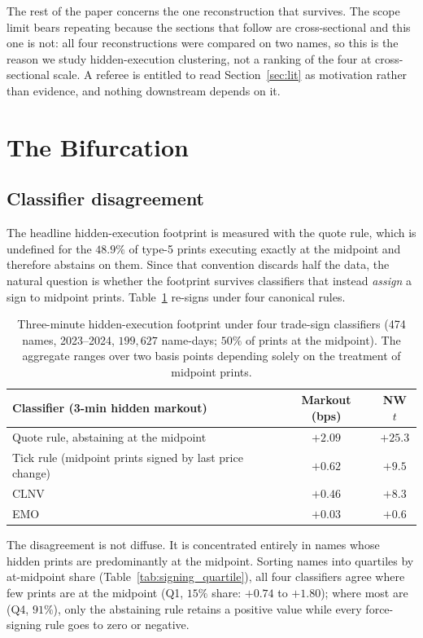 \documentclass[11pt]{article}
\begin{document}
The rest of the paper concerns the one reconstruction that survives. The scope limit bears
repeating because the sections that follow are cross-sectional and this one is not: all four
reconstructions were compared on two names, so this is the reason we study hidden-execution
clustering, not a ranking of the four at cross-sectional scale. A referee is entitled to
read Section~\ref{sec:lit} as motivation rather than evidence, and nothing downstream
depends on it.

\section{The Bifurcation}
\label{sec:bifurcation}

\subsection{Classifier disagreement}

The headline hidden-execution footprint is measured with the quote rule, which is undefined
for the $48.9\%$ of type-5 prints executing exactly at the midpoint and therefore abstains
on them. Since that convention discards half the data, the natural question is whether the
footprint survives classifiers that instead \emph{assign} a sign to midpoint prints.
Table~\ref{tab:signing} re-signs under four canonical rules.

\begin{table}[htbp]
\centering
\begin{tabular}{lcc}
\toprule
\textbf{Classifier (3-min hidden markout)} & \textbf{Markout (bps)} & \textbf{NW $t$} \\
\midrule
Quote rule, abstaining at the midpoint & $+2.09$ & $+25.3$ \\
Tick rule (midpoint prints signed by last price change) & $+0.62$ & $+9.5$ \\
CLNV \citep{chakrabarty2007} & $+0.46$ & $+8.3$ \\
EMO \citep{ellis2000} & $+0.03$ & $+0.6$ \\
\bottomrule
\end{tabular}
\caption{Three-minute hidden-execution footprint under four trade-sign classifiers
(474 names, 2023--2024, $199{,}627$ name-days; $50\%$ of prints at the midpoint). The
aggregate ranges over two basis points depending solely on the treatment of midpoint
prints.}
\label{tab:signing}
\end{table}

The disagreement is not diffuse. It is concentrated entirely in names whose hidden prints
are predominantly at the midpoint. Sorting names into quartiles by at-midpoint share
(Table~\ref{tab:signing_quartile}), all four classifiers agree where few prints are at the
midpoint (Q1, $15\%$ share: $+0.74$ to $+1.80$); where most are (Q4, $91\%$), only the
abstaining rule retains a positive value while every force-signing rule goes to zero or
negative.
\end{document}

